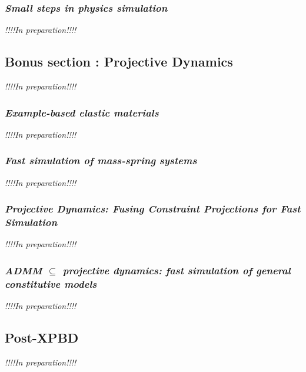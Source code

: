 \documentclass[pdflatex,sn-mathphys-num]{sn-jnl}%
\theoremstyle{thmstyleone}%
\theoremstyle{thmstyletwo}%
\theoremstyle{thmstylethree}%
\newcommand{\inprep}{
	\begin{center}
		\sl\rm {!!!!In preparation!!!!}
\end{center}}
\begin{document}
\subsubsection{{\sl Small steps in physics simulation}\cite{SmallSteps}}
\inprep
\subsection{Bonus section : Projective Dynamics}
\inprep
\subsubsection{{\sl Example-based elastic materials}\cite{Example-basedMartin}}
\inprep
\subsubsection{{\sl Fast simulation of mass-spring systems}\cite{fastMassTiantian}}
\inprep
\subsubsection{\small{\sl Projective Dynamics: Fusing Constraint Projections for Fast Simulation}\cite{ProjDyn}}
\inprep
\subsubsection{\small{\sl ADMM $\subseteq$ projective dynamics: fast simulation of general constitutive models}\cite{ADMM_Proj}}
\inprep

\subsection{Post-XPBD}
\inprep
\newpage
\appendix
\end{document}
